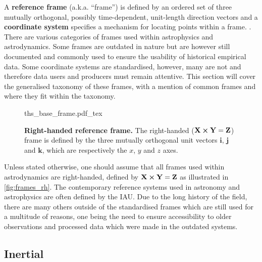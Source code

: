 A \textbf{reference frame} (a.k.a. ``frame'') is defined by an ordered set of three mutually orthogonal, possibly time-dependent, unit-length direction vectors and a \textbf{coordinate system} specifies a mechanism for locating points within a frame. \cite[p.~4]{SpiceReferenceFrames2020}. There are various categories of frames used within astrophysics and astrodynamics. Some frames are outdated in nature but are however still documented and commonly used to ensure the usability of historical empirical data. Some coordinate systems are standardised, however, many are not and therefore data users and producers must remain attentive. This section will cover the generalised taxonomy of these frames, with a mention of common frames and where they fit within the taxonomy.

\begin{figure}[h]
    \centering
    \def\svgwidth{0.72\linewidth}
    \captionsetup{format=hang} %
    {ths_base_frame.pdf_tex}
    \caption{\textbf{Right-handed reference frame.} The right-handed ($\mathbf{X}\cross{\mathbf{Y}}=\mathbf{Z}$) frame is defined by the three mutually orthogonal unit vectors $\mathbf{i}$, $\mathbf{j}$ and $\mathbf{k}$, which are respectively the $x$, $y$ and $z$ axes. }
    \label{fig:frames_rh}
\end{figure}

Unless stated otherwise, one should assume that all frames used within astrodynamics are right-handed, defined by $\mathbf{X}\cross{\mathbf{Y}}=\mathbf{Z}$ as illustrated in \autoref{fig:frames_rh}. The contemporary reference systems used in astronomy and astrophysics are often defined by the \gls{IAU}. Due to the long history of the field, there are many others outside of the  standardised frames which are still used for a multitude of reasons, one being the need to ensure accessibility to older observations and processed data which were made in the outdated systems.

\subsection{Inertial}\label{ssec:frame_intertial}

